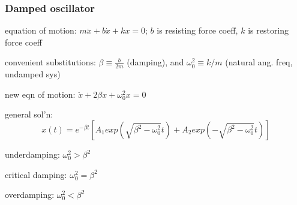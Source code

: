 \documentclass[letterpaper,landscape,10pt]{article}
\newenvironment{mydescription}
{\begin{description}
	\setlength{\itemsep}{0pt}
	\setlength{\parskip}{0pt}
	\setlength{\parsep}{-1pt}}
{\end{description}}
\begin{document}
{\begin{multicols}{3}
{		}
	
	\subsubsection*{Damped oscillator}
		\begin{mydescription}
			\item[equation of motion:]
				$m\ddot{x} + b\dot{x} + kx = 0$; $b$ is resisting force coeff,
				$k$ is restoring force coeff  \\
			\item[convenient substitutions:]
				$\beta \equiv \frac{b}{2m}$ (damping), and $\omega_0^2 \equiv
				k/m$ (natural ang. freq, undamped sys)  \\
			\item[new eqn of motion:]
				$\ddot{x} + 2\beta\dot{x} + \omega_0^2x = 0$  \\
			\item[general sol'n:]
				$$
					x(t) = e^{-\beta t}\left[ A_1exp\left(
					\sqrt{\beta^2-\omega_0^2}t\right) + A_2exp\left(
					-\sqrt{\beta^2-\omega_0^2}t\right) \right]
				$$
			\item[underdamping:]
				$\omega_0^2 > \beta^2$  \\
			\item[critical damping:]
				$\omega_0^2 = \beta^2$  \\
			\item[overdamping:]
				$\omega_0^2 < \beta^2$  \\
		\end{mydescription}
	

\end{multicols}}
\end{document}
